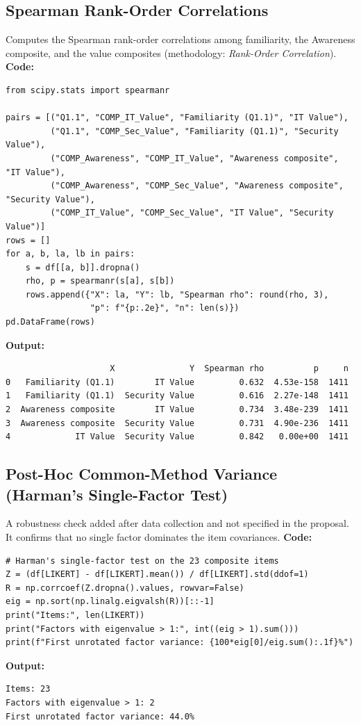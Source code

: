 \subsection{Spearman Rank-Order Correlations}
Computes the Spearman rank-order correlations among familiarity, the Awareness composite, and the value composites (methodology: \emph{Rank-Order Correlation}).
\noindent\textbf{Code:}\nopagebreak
{\scriptsize\begin{verbatim}
from scipy.stats import spearmanr

pairs = [("Q1.1", "COMP_IT_Value", "Familiarity (Q1.1)", "IT Value"),
         ("Q1.1", "COMP_Sec_Value", "Familiarity (Q1.1)", "Security Value"),
         ("COMP_Awareness", "COMP_IT_Value", "Awareness composite", "IT Value"),
         ("COMP_Awareness", "COMP_Sec_Value", "Awareness composite", "Security Value"),
         ("COMP_IT_Value", "COMP_Sec_Value", "IT Value", "Security Value")]
rows = []
for a, b, la, lb in pairs:
    s = df[[a, b]].dropna()
    rho, p = spearmanr(s[a], s[b])
    rows.append({"X": la, "Y": lb, "Spearman rho": round(rho, 3),
                 "p": f"{p:.2e}", "n": len(s)})
pd.DataFrame(rows)
\end{verbatim}}
\noindent\textbf{Output:}\nopagebreak
{\scriptsize\begin{verbatim}
                     X               Y  Spearman rho          p     n
0   Familiarity (Q1.1)        IT Value         0.632  4.53e-158  1411
1   Familiarity (Q1.1)  Security Value         0.616  2.27e-148  1411
2  Awareness composite        IT Value         0.734  3.48e-239  1411
3  Awareness composite  Security Value         0.731  4.90e-236  1411
4             IT Value  Security Value         0.842   0.00e+00  1411
\end{verbatim}}

\subsection{Post-Hoc Common-Method Variance (Harman's Single-Factor Test)}
A robustness check added after data collection and not specified in the proposal. It confirms that no single factor dominates the item covariances.
\noindent\textbf{Code:}\nopagebreak
{\tiny\begin{verbatim}
# Harman's single-factor test on the 23 composite items
Z = (df[LIKERT] - df[LIKERT].mean()) / df[LIKERT].std(ddof=1)
R = np.corrcoef(Z.dropna().values, rowvar=False)
eig = np.sort(np.linalg.eigvalsh(R))[::-1]
print("Items:", len(LIKERT))
print("Factors with eigenvalue > 1:", int((eig > 1).sum()))
print(f"First unrotated factor variance: {100*eig[0]/eig.sum():.1f}%")
\end{verbatim}}
\noindent\textbf{Output:}\nopagebreak
{\scriptsize\begin{verbatim}
Items: 23
Factors with eigenvalue > 1: 2
First unrotated factor variance: 44.0%
\end{verbatim}}


